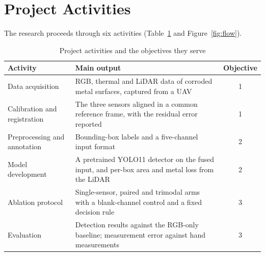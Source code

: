 \section{Project Activities}
\label{sec:project-activities}

The research proceeds through six activities (Table~\ref{tab:activities} and
Figure~\ref{fig:flow}).

\begin{table}[htbp]
\centering
\caption{Project activities and the objectives they serve}
\label{tab:activities}
\small
\renewcommand{\arraystretch}{1.2}
\begin{tabularx}{\textwidth}{@{}>{\RaggedRight\arraybackslash}p{3.6cm}>{\RaggedRight\arraybackslash}Xc@{}}
\toprule
\textbf{Activity} & \textbf{Main output} & \textbf{Objective} \\
\midrule
Data acquisition & RGB, thermal and LiDAR data of corroded metal surfaces, captured from a UAV & 1 \\
Calibration and registration & The three sensors aligned in a common reference frame, with the residual error reported & 1 \\
Preprocessing and annotation & Bounding-box labels and a five-channel input format & 2 \\
Model development & A pretrained YOLO11 detector on the fused input, and per-box area and metal loss from the LiDAR & 2 \\
Ablation protocol & Single-sensor, paired and trimodal arms with a blank-channel control and a fixed decision rule & 3 \\
Evaluation & Detection results against the RGB-only baseline; measurement error against hand measurements & 3 \\
\bottomrule
\end{tabularx}
\end{table}

